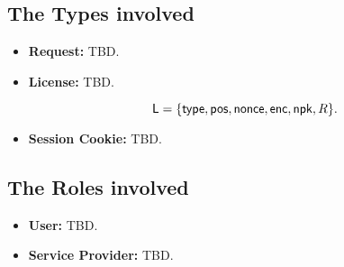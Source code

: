 \subsection{The Types involved} 

\begin{itemize}
    \item \textbf{Request:} TBD.
    \item \textbf{License:} TBD.

    $$\mathsf{L} = \{\mathsf{type}, \mathsf{pos}, \mathsf{nonce}, \mathsf{enc}, \mathsf{npk}, R\}.$$

    \item \textbf{Session Cookie:} TBD.
\end{itemize}


\subsection{The Roles involved} 

\begin{itemize}
    \item \textbf{User:} TBD.
    \item \textbf{Service Provider:} TBD.
\end{itemize}